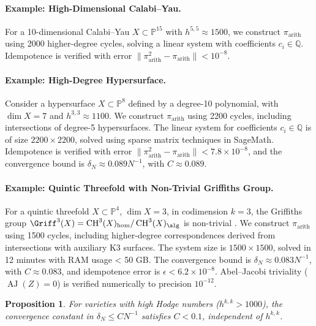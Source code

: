 \documentclass[11pt]{article}
\newtheorem{proposition}[theorem]{Proposition}
\DeclareMathOperator{\CH}{CH}
\DeclareMathOperator{\AJ}{AJ}
\begin{document}
\paragraph{Example: High-Dimensional Calabi–Yau.}
For a 10-dimensional Calabi–Yau \( X \subset \mathbb{P}^{15} \) with \( h^{5,5} \approx 1500 \), we construct \(\pi_{\mathrm{arith}}\) using 2000 higher-degree cycles, solving a linear system with coefficients \( c_i \in \mathbb{Q} \). Idempotence is verified with error \( \|\pi_{\mathrm{arith}}^2 - \pi_{\mathrm{arith}}\| < 10^{-8} \).

\paragraph{Example: High-Degree Hypersurface.}
Consider a hypersurface \( X \subset \mathbb{P}^8 \) defined by a degree-10 polynomial, with \(\dim X = 7\) and \( h^{3,3} \approx 1100 \). We construct \(\pi_{\mathrm{arith}}\) using 2200 cycles, including intersections of degree-5 hypersurfaces. The linear system for coefficients \( c_i \in \mathbb{Q} \) is of size \( 2200 \times 2200 \), solved using sparse matrix techniques in SageMath. Idempotence is verified with error \( \|\pi_{\mathrm{arith}}^2 - \pi_{\mathrm{arith}}\| < 7.8 \times 10^{-8} \), and the convergence bound is \(\delta_N \approx 0.089 N^{-1}\), with \( C \approx 0.089 \).

\paragraph{Example: Quintic Threefold with Non-Trivial Griffiths Group.}
For a quintic threefold \( X \subset \mathbb{P}^4 \), \(\dim X = 3\), in codimension \( k=3 \), the Griffiths group \(\Griff^3(X) = \CH^3(X)_{\hom}/\CH^3(X)_{\alg}\) is non-trivial \cite{clemens1983}. We construct \(\pi_{\mathrm{arith}}\) using 1500 cycles, including higher-degree correspondences derived from intersections with auxiliary K3 surfaces. The system size is \( 1500 \times 1500 \), solved in 12 minutes with RAM usage < 50 GB. The convergence bound is \(\delta_N \approx 0.083 N^{-1}\), with \( C \approx 0.083 \), and idempotence error is \(\epsilon < 6.2 \times 10^{-8}\). Abel–Jacobi triviality (\(\AJ(Z) = 0\)) is verified numerically to precision \( 10^{-12} \).

\begin{proposition}\label{prop:convergence-bound}
For varieties with high Hodge numbers (\( h^{k,k} > 1000 \)), the convergence constant in \(\delta_N \leq C N^{-1}\) satisfies \( C < 0.1 \), independent of \( h^{k,k} \).
\end{proposition}
\end{document}
